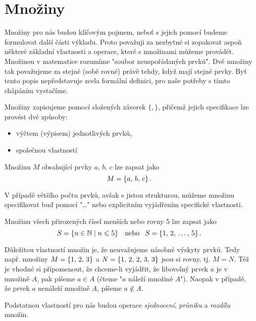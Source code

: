 \section{Množiny}

Množiny pro nás budou klíčovým pojmem, neboť s jejich pomocí budeme formulovat další části výkladu. Proto považuji za nezbytné si zopakovat aspoň některé základní vlastnosti a operace, které s množinami můžeme provádět. Množinou v matematice rozumíme "soubor neuspořádaných prvků". Dvě množiny tak považujeme za stejné (sobě rovné) právě tehdy, když mají stejné prvky. Byť tento popis nepředstavuje zcela formální definici, pro naše potřeby s tímto chápáním vystačíme.\par
Množiny zapisujeme pomocí složených závorek $\{,\}$, přičemž jejich specifikace lze provést dvě způsoby:
\begin{itemize}
    \item výčtem (výpisem) jednotlivých prvků,
    \item společnou vlastností
\end{itemize}

\begin{example}
    Množinu $M$ obsahující prvky $a,\,b,\,c$ lze zapsat jako
    \begin{equation*}
        M=\left\{a,\,b,\,c\right\}.
    \end{equation*}
\end{example}
V případě většího počtu prvků, avšak s jistou strukturou, můžeme množinu specifikovat buď pomocí "\dots" nebo explicitním vyjádřením specifické vlastnosti.

\begin{example}
    Množinu všech přirozených čísel menších nebo rovny 5 lze zapsat jako
    \begin{equation*}
        S=\left\{n\in\mathbb{N} \;\middle\vert\; n \leqslant 5\right\}\;\;\;\text{nebo}\;\;\;S=\left\{1,\,2,\,\dots,\,5\right\}.
    \end{equation*}
\end{example}

Důležitou vlastností množin je, že neuvažujeme násobné výskyty prvků. Tedy např. množiny $M=\left\{1,\,2,\,3\right\}$ a $N=\left\{1,\,2,\,2,\,3,\,3\right\}$ jsou si rovny, tj. $M=N$. Též je vhodné si připomenout, že chceme-li vyjádřit, že libovolný prvek $a$ je v množině $A$, pak píšeme $a \in A$ (čteme "$a$ náleží množině $A$"). Naopak v případě, že prvek $a$ nenáleží množině $A$, píšeme $a \notin A$.\par
Podstatnou vlastností pro nás budou operace \emph{sjednocení}, \emph{průniku} a \emph{rozdílu} množin.

